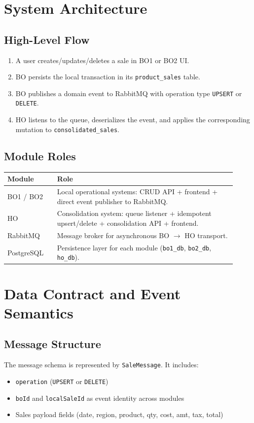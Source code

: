 \documentclass[11pt,a4paper]{article}
\begin{document}
\section{System Architecture}
\subsection{High-Level Flow}
\begin{enumerate}[leftmargin=*]
  \item A user creates/updates/deletes a sale in BO1 or BO2 UI.
  \item BO persists the local transaction in its \texttt{product\_sales} table.
  \item BO publishes a domain event to RabbitMQ with operation type \texttt{UPSERT} or \texttt{DELETE}.
  \item HO listens to the queue, deserializes the event, and applies the corresponding mutation to \texttt{consolidated\_sales}.
\end{enumerate}

\subsection{Module Roles}
\begin{longtable}{|p{0.2\linewidth}|p{0.72\linewidth}|}
\hline
\textbf{Module} & \textbf{Role} \\
\hline
BO1 / BO2 & Local operational systems: CRUD API + frontend + direct event publisher to RabbitMQ. \\
\hline
HO & Consolidation system: queue listener + idempotent upsert/delete + consolidation API + frontend. \\
\hline
RabbitMQ & Message broker for asynchronous BO $\rightarrow$ HO transport. \\
\hline
PostgreSQL & Persistence layer for each module (\texttt{bo1\_db}, \texttt{bo2\_db}, \texttt{ho\_db}). \\
\hline
\end{longtable}

\section{Data Contract and Event Semantics}
\subsection{Message Structure}
The message schema is represented by \texttt{SaleMessage}. It includes:
\begin{itemize}[leftmargin=*]
  \item \texttt{operation} (\texttt{UPSERT} or \texttt{DELETE})
  \item \texttt{boId} and \texttt{localSaleId} as event identity across modules
  \item Sales payload fields (date, region, product, qty, cost, amt, tax, total)
\end{itemize}
\end{document}
